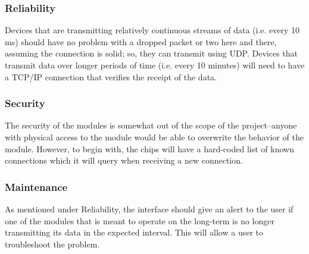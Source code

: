 \documentclass[onecolumn, draftclsnofoot,10pt, compsoc]{IEEEtran}
\begin{document}
\subsubsection{Reliability}
Devices that are transmitting relatively continuous streams of data (i.e. every 10 ms) should have no problem with a dropped packet or two here and there, assuming the connection is solid; so, they can transmit using UDP. Devices that transmit data over longer periods of time (i.e. every 10 minutes) will need to have a TCP/IP connection that verifies the receipt of the data.
\subsubsection{Security}
The security of the modules is somewhat out of the scope of the project--anyone with physical access to the module would be able to overwrite the behavior of the module. However, to begin with, the chips will have a hard-coded list of known connections which it will query when receiving a new connection.

\subsubsection{Maintenance}
As mentioned under Reliability, the interface should give an alert to the user if one of the modules that is meant to operate on the long-term is no longer transmitting its data in the expected interval. This will allow a user to troubleshoot the problem.
\end{document}
